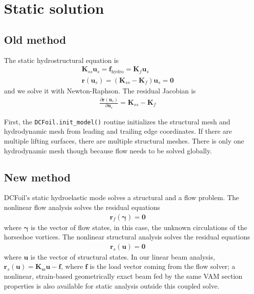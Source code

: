 \documentclass[10pt]{article}
\newcommand{\pp}[2]{\frac{\partial #1}{\partial #2}}
\newcommand{\mbf}[1]{\mathbf{#1}}
\newcommand{\mbs}[1]{\boldsymbol{#1}}
\newcommand{\be}{\begin{eqnarray}}
\newcommand{\ee}{\end{eqnarray}}
\newcommand{\beq}{\begin{equation}\begin{aligned}}
\newcommand{\eeq}{\end{aligned}\end{equation}}
\newcommand{\Uinf}{U_{\infty}}
\newcommand{\tn}[1]{\textrm{#1}}
\begin{document}

\section{Static solution}

\subsection{Old method}
The static hydrostructural equation is
\be
\mbf{K}_{ss} \mbf{u}_s   = \mbf{f}_{\tn{hydro}} = \mbf{K}_f \mbf{u}_s
\\
\mbf{r}(\mbf{u}_s) = \left(\mbf{K}_{ss} - \mbf{K}_f\right)\mbf{u}_s  = \mbf{0}
\ee
and we solve it with Newton-Raphson.
The residual Jacobian is
\be
\pp{\mbf{r}(\mbf{u}_s)}{\mbf{u}_s}
=
\mbf{K}_{ss} - \mbf{K}_{f}
\ee

First, the \texttt{DCFoil.init\_model()} routine initializes the structural mesh and hydrodynamic mesh from leading and trailing edge coordinates.
If there are multiple lifting surfaces, there are multiple structural meshes.
There is only one hydrodynamic mesh though because flow needs to be solved globally.

\subsection{New method}
DCFoil's static hydroelastic mode solves a structural and a flow problem.
The nonlinear flow analysis solves the residual equations
\beq
\mbf{r}_f(\mbs{\gamma}) = \mbf{0}
\eeq
where $\mbs{\gamma}$ is the vector of flow states, in this case, the unknown circulations of the horseshoe vortices.
The nonlinear structural analysis solves the residual equations
\beq
\mbf{r}_s(\mbf{u}) = \mbf{0}
\eeq
where $\mbf{u}$ is the vector of structural states.
In our linear beam analysis, $\mbf{r}_s(\mbf{u}) = \mbf{K}_\tn{ss} \mbf{u} - \mbf{f}$, where $\mbf{f}$ is the load vector coming from the flow solver; a nonlinear, strain-based geometrically exact beam fed by the same \ac{VAM} section properties is also available for static analysis outside this coupled solve.
\end{document}
